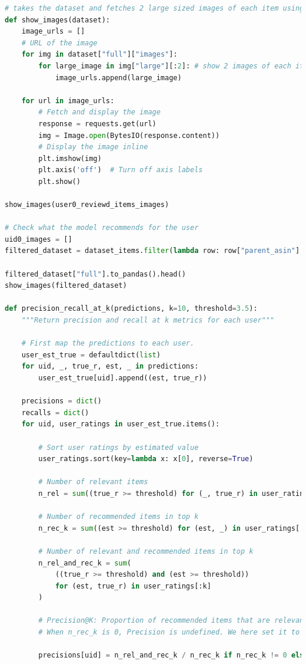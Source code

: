 \documentclass{article}
\begin{document}
\begin{lstlisting}[language=Python]
# takes the dataset and fetches 2 large sized images of each item using its url
def show_images(dataset):
    image_urls = []
    # URL of the image
    for img in dataset["full"]["images"]:
        for large_image in img["large"][:2]: # show 2 images of each item that is recommended
            image_urls.append(large_image)

    for url in image_urls:
        # Fetch and display the image
        response = requests.get(url)
        img = Image.open(BytesIO(response.content))
        # Display the image inline
        plt.imshow(img)
        plt.axis('off')  # Turn off axis labels
        plt.show()

show_images(user0_reviewd_items_images)

# Check what the model recommends for the user
uid0_images = []
filtered_dataset = dataset_items.filter(lambda row: row["parent_asin"] in iids)

filtered_dataset["full"].to_pandas().head()
show_images(filtered_dataset)

def precision_recall_at_k(predictions, k=10, threshold=3.5):
    """Return precision and recall at k metrics for each user"""

    # First map the predictions to each user.
    user_est_true = defaultdict(list)
    for uid, _, true_r, est, _ in predictions:
        user_est_true[uid].append((est, true_r))

    precisions = dict()
    recalls = dict()
    for uid, user_ratings in user_est_true.items():

        # Sort user ratings by estimated value
        user_ratings.sort(key=lambda x: x[0], reverse=True)

        # Number of relevant items
        n_rel = sum((true_r >= threshold) for (_, true_r) in user_ratings)

        # Number of recommended items in top k
        n_rec_k = sum((est >= threshold) for (est, _) in user_ratings[:k])

        # Number of relevant and recommended items in top k
        n_rel_and_rec_k = sum(
            ((true_r >= threshold) and (est >= threshold))
            for (est, true_r) in user_ratings[:k]
        )

        # Precision@K: Proportion of recommended items that are relevant
        # When n_rec_k is 0, Precision is undefined. We here set it to 0.

        precisions[uid] = n_rel_and_rec_k / n_rec_k if n_rec_k != 0 else 0


\end{lstlisting}
\end{document}

